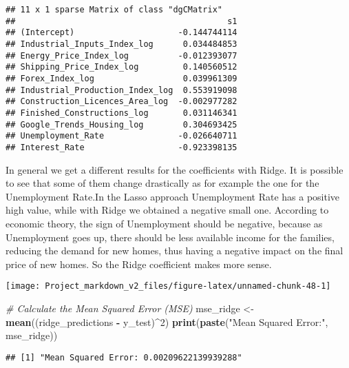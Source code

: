 \documentclass[
]{article}
\newenvironment{Shaded}{\begin{snugshade}}{\end{snugshade}}
\newcommand{\CommentTok}[1]{\textcolor[rgb]{0.56,0.35,0.01}{\textit{#1}}}
\newcommand{\DecValTok}[1]{\textcolor[rgb]{0.00,0.00,0.81}{#1}}
\newcommand{\FunctionTok}[1]{\textcolor[rgb]{0.13,0.29,0.53}{\textbf{#1}}}
\newcommand{\NormalTok}[1]{#1}
\newcommand{\OtherTok}[1]{\textcolor[rgb]{0.56,0.35,0.01}{#1}}
\newcommand{\SpecialCharTok}[1]{\textcolor[rgb]{0.81,0.36,0.00}{\textbf{#1}}}
\newcommand{\StringTok}[1]{\textcolor[rgb]{0.31,0.60,0.02}{#1}}
\begin{document}
\begin{verbatim}
## 11 x 1 sparse Matrix of class "dgCMatrix"
##                                           s1
## (Intercept)                     -0.144744114
## Industrial_Inputs_Index_log      0.034484853
## Energy_Price_Index_log          -0.012393077
## Shipping_Price_Index_log         0.140560512
## Forex_Index_log                  0.039961309
## Industrial_Production_Index_log  0.553919098
## Construction_Licences_Area_log  -0.002977282
## Finished_Constructions_log       0.031146341
## Google_Trends_Housing_log        0.304693425
## Unemployment_Rate               -0.026640711
## Interest_Rate                   -0.923398135
\end{verbatim}

In general we get a different results for the coefficients with Ridge.
It is possible to see that some of them change drastically as for
example the one for the Unemployment Rate.In the Lasso approach
Unemployment Rate has a positive high value, while with Ridge we
obtained a negative small one. According to economic theory, the sign of
Unemployment should be negative, because as Unemployment goes up, there
should be less available income for the families, reducing the demand
for new homes, thus having a negative impact on the final price of new
homes. So the Ridge coefficient makes more sense.

\begin{center}\texttt{[image: Project\_markdown\_v2\_files/figure-latex/unnamed-chunk-48-1]} \end{center}

\begin{Shaded}
\begin{Highlighting}[]
\CommentTok{\# Calculate the Mean Squared Error (MSE)}
\NormalTok{mse\_ridge }\OtherTok{\textless{}{-}} \FunctionTok{mean}\NormalTok{((ridge\_predictions }\SpecialCharTok{{-}}\NormalTok{ y\_test)}\SpecialCharTok{\^{}}\DecValTok{2}\NormalTok{)}
\FunctionTok{print}\NormalTok{(}\FunctionTok{paste}\NormalTok{(}\StringTok{"Mean Squared Error:"}\NormalTok{, mse\_ridge))}
\end{Highlighting}
\end{Shaded}

\begin{verbatim}
## [1] "Mean Squared Error: 0.00209622139939288"
\end{verbatim}
\end{document}

